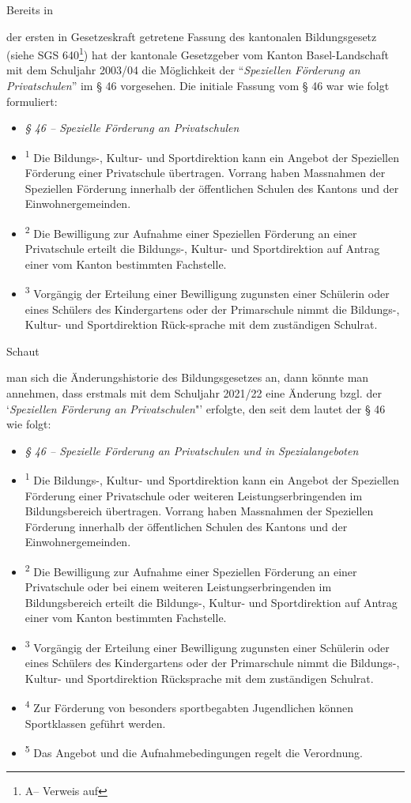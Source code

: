 \documentclass[10pt,parskip]{scrbook}
\newcounter{rz}
\newcommand{\Rz}{\addtocounter{rz}{1}\marginpar{\texttt{\textit{A\arabic{rz}}}}}
\newif\ifFooterInfo
\newcommand{\GNorm}[3]{#1 #2\ifFooterInfo\footnote{A\therz -- Verweis auf \ifstrempty{#3}{\citefield{#1#2}{title}}{\citefield{#1#3}{title}}}}
\begin{document}
Bereits in \Rz der ersten in Gesetzeskraft getretene Fassung des kantonalen Bildungsgesetz (siehe \GNorm{SGS}{640}{}) hat der kantonale Gesetzgeber vom Kanton Basel-Landschaft mit dem Schuljahr 2003/04 die Möglichkeit der "`\textsl{Speziellen Förderung an Privatschulen}"' im § 46 vorgesehen. Die initiale Fassung vom § 46 war wie folgt formuliert:

\begin{itemize}[noitemsep]\setlength\itemsep{0.3em}
	\item[] \textit{§ 46 -- Spezielle Förderung an Privatschulen}
	\item[] \textsuperscript{1}	Die Bildungs-, Kultur- und Sportdirektion kann ein Angebot der Speziellen Förderung einer Privatschule übertragen. Vorrang haben Massnahmen der Speziellen Förderung innerhalb der öffentlichen Schulen des Kantons und der Einwohnergemeinden.
	\item[] \textsuperscript{2}	Die Bewilligung zur Aufnahme einer Speziellen Förderung an einer Privatschule erteilt die Bildungs-, Kultur- und Sportdirektion auf Antrag einer vom Kanton bestimmten Fachstelle.
	\item[] \textsuperscript{3}	Vorgängig der Erteilung einer Bewilligung zugunsten einer Schülerin oder eines Schülers des Kindergartens oder der Primarschule nimmt die Bildungs-, Kultur- und Sportdirektion Rück-sprache mit dem zuständigen Schulrat.
\end{itemize} 

Schaut \Rz man sich die Änderungshistorie des Bildungsgesetzes an, dann könnte man annehmen, dass erstmals mit dem Schuljahr 2021/22 eine Änderung bzgl. der `\textsl{Speziellen Förderung an Privatschulen}"' erfolgte, den seit dem lautet der § 46 wie folgt:

\begin{itemize}[noitemsep]\setlength\itemsep{0.3em}
	\item[] \textit{§ 46 -- Spezielle Förderung an Privatschulen und in Spezialangeboten}
	\item[] \textsuperscript{1}	Die Bildungs-, Kultur- und Sportdirektion kann ein Angebot der Speziellen Förderung einer Privatschule oder weiteren Leistungserbringenden im Bildungsbereich übertragen. Vorrang haben Massnahmen der Speziellen Förderung innerhalb der öffentlichen Schulen des Kantons und der Einwohnergemeinden. 
	\item[] \textsuperscript{2}	Die Bewilligung zur Aufnahme einer Speziellen Förderung an einer Privatschule oder bei einem weiteren Leistungserbringenden im Bildungsbereich erteilt die Bildungs-, Kultur- und Sportdirektion auf Antrag einer vom Kanton bestimmten Fachstelle.
	\item[] \textsuperscript{3}	Vorgängig der Erteilung einer Bewilligung zugunsten einer Schülerin oder eines Schülers des Kindergartens oder der Primarschule nimmt die Bildungs-, Kultur- und Sportdirektion Rücksprache mit dem zuständigen Schulrat.
	\item[] \textsuperscript{4}	Zur Förderung von besonders sportbegabten Jugendlichen können Sportklassen geführt werden.
	\item[] \textsuperscript{5}	Das Angebot und die Aufnahmebedingungen regelt die Verordnung. 
\end{itemize} 
\end{document}
